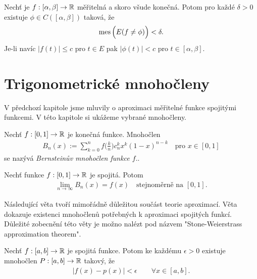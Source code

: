 \begin{theorem}[Lusin]
\label{v_1.4.6_Lusin}
Nechť je $f:[\alpha, \beta]\to \mathbb{R}$ měřitelná a skoro všude konečná. Potom pro každé $\delta>0$ existuje $\phi \in C([\alpha, \beta])$ taková, že 
\begin{align*}
\operatorname{mes}\Big(E(f \neq \phi)\Big)<\delta.
\end{align*}
Je-li navíc $|f(t)| \leq c$ pro $t \in E$ pak $|\phi(t)|<c $ pro $t \in [\alpha, \beta]$.
\end{theorem}

\section{Trigonometrické mnohočleny}

V předchozí kapitole jsme mluvily o aproximaci měřitelné funkce spojitými funkcemi. V této kapitole si ukážeme vybrané mnohočleny. 
\begin{definition}
Nechť $f:[0,1]\to \mathbb{R}$ je konečná funkce. Mnohočlen 
\begin{align*}
B_n(x):=\sum \limits _{k=0}^{n} f\Big(\frac{k}{n}\Big)c^k_nx^k(1-x)^{n-k} \quad \text{pro $x \in [0,1]$}
\end{align*}
se nazývá \textit{Bernstein\r uv mnohočlen funkce $f$}..
\label{def_bernstein}
\end{definition}

\begin{theorem}[Bernstein]
Nechť funkce $f:[0,1] \to \mathbb{R}$ je spojitá. Potom 
\begin{align*}
\lim \limits _{n \to \infty} B_n(x)=f(x) \quad \textrm{stejnoměrně na $[0,1]$.}
\end{align*}
\end{theorem}


Následující věta tvoří mimořádně důležitou součást teorie aproximací. Věta dokazuje existenci mnohočlen\r u potřebných k aproximaci spojitých funkcí. Důležité zobecnění této věty je možno nalézt pod názvem "Stone-Weierstrass approximation theorem".

\begin{theorem}
[Weierstrass]
Nechť $f:[a,b] \to \mathbb{R}$ je spojitá funkce. Potom ke každému $\epsilon >0 $ existuje mnohočlen $P:[a,b] \to \mathbb{R}$ takový, že
\begin{align*}
|f(x)-p(x)|<\epsilon \qquad  \forall x \in [a,b].
\end{align*}
\label{v_1.27_Weierstrass}
\end{theorem}

